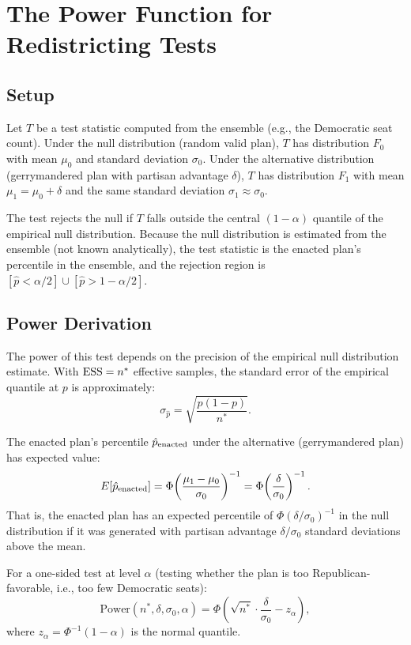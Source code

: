 \section{The Power Function for Redistricting Tests}
\label{sec:power}

\subsection{Setup}

Let $T$ be a test statistic computed from the ensemble (e.g., the
Democratic seat count).
Under the null distribution (random valid plan), $T$ has distribution
$F_0$ with mean $\mu_0$ and standard deviation $\sigma_0$.
Under the alternative distribution (gerrymandered plan with partisan
advantage $\delta$), $T$ has distribution $F_1$ with mean
$\mu_1 = \mu_0 + \delta$ and the same standard deviation $\sigma_1 \approx \sigma_0$.

The test rejects the null if $T$ falls outside the central
$(1 - \alpha)$ quantile of the empirical null distribution.
Because the null distribution is estimated from the ensemble (not known
analytically), the test statistic is the enacted plan's percentile
in the ensemble, and the rejection region is $[\hat{p} < \alpha/2]
\cup [\hat{p} > 1 - \alpha/2]$.

\subsection{Power Derivation}

The power of this test depends on the precision of the empirical
null distribution estimate.
With $\mathrm{ESS} = n^*$ effective samples, the standard error of the
empirical quantile at $p$ is approximately:
\[
  \sigma_{\hat{p}} = \sqrt{\frac{p(1-p)}{n^*}}.
\]

The enacted plan's percentile $\hat{p}_{\rm enacted}$ under the
alternative (gerrymandered plan) has expected value:
\[
  E[\hat{p}_{\rm enacted}] = \Phi\!\left(\frac{\mu_1 - \mu_0}{\sigma_0}\right)^{-1}
  = \Phi\!\left(\frac{\delta}{\sigma_0}\right)^{-1}.
\]
That is, the enacted plan has an expected percentile of $\Phi(\delta/\sigma_0)^{-1}$
in the null distribution if it was generated with partisan advantage $\delta/\sigma_0$
standard deviations above the mean.

For a one-sided test at level $\alpha$ (testing whether the plan is
too Republican-favorable, i.e., too few Democratic seats):
\[
  \text{Power}(n^*, \delta, \sigma_0, \alpha) =
  \Phi\!\left(\sqrt{n^*} \cdot \frac{\delta}{\sigma_0} - z_\alpha\right),
\]
where $z_\alpha = \Phi^{-1}(1 - \alpha)$ is the normal quantile.


